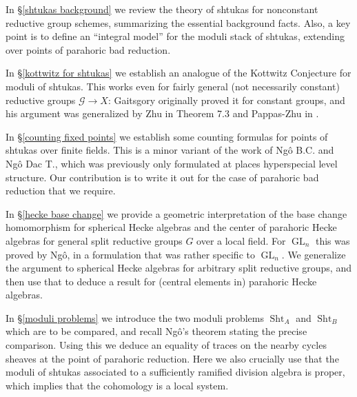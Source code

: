 \documentclass[reqno]{amsart}
\numberwithin{equation}{section}
\newcommand{\Cal}[1]{\mathcal{#1}}
\DeclareMathOperator{\GL}{GL}
\DeclareMathOperator{\Sht}{Sht}
\theoremstyle{remark}
\numberwithin{equation}{section}
\begin{document}
In \S \ref{shtukas background} we review the theory of shtukas for nonconstant reductive group schemes, summarizing the essential background facts. Also, a key point is to define an ``integral model'' for the moduli stack of shtukas, extending over points of parahoric bad reduction. 

 In \S \ref{kottwitz for shtukas} we establish an analogue of the Kottwitz Conjecture for moduli of shtukas. This works even for fairly general (not necessarily constant) reductive groups $\Cal{G} \rightarrow X$: Gaitsgory originally proved it for constant groups, and his argument was generalized by Zhu in \cite{Zhu14} Theorem 7.3 and Pappas-Zhu in \cite{PZ13}. 
 
 In \S \ref{counting fixed points} we establish some counting formulas for points of shtukas over finite fields. This is a minor variant of the work of Ng\^{o} B.C. and Ng\^{o} Dac T., which was previously only formulated at places hyperspecial level structure. Our contribution is to write it out for the case of parahoric bad reduction that we require. 
 
 
 In \S \ref{hecke base change} we provide a geometric interpretation of the base change homomorphism for spherical Hecke algebras and the center of parahoric Hecke algebras for general split reductive groups $G$ over a local field. For $\GL_n$ this was proved by Ng\^{o}, in a formulation that was rather specific to $\GL_n$. We generalize the argument to spherical Hecke algebras for arbitrary split reductive groups, and then use that to deduce a result for (central elements in) 	parahoric Hecke algebras. 
 
 In \S \ref{moduli  problems} we introduce the two moduli problems $\Sht_A$ and $\Sht_B$ which are to be compared, and recall Ng\^{o}'s theorem stating the precise comparison. Using this we deduce an equality of traces on the nearby cycles sheaves at the point of parahoric reduction. Here we also crucially use that the moduli of shtukas associated to a sufficiently ramified division algebra is proper, which implies that the cohomology is a local system. %
 
\end{document}
